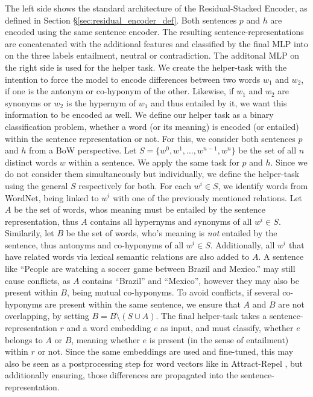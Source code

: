 The left side shows the standard architecture of the Residual-Stacked Encoder, as defined in Section §\ref{sec:residual_encoder_def}. Both sentences $p$ and $h$ are encoded using the same sentence encoder. The resulting sentence-representations are concatenated with the additional features and classified by the final \ac{MLP} into on the three labels entailment, neutral or contradiction. The additonal \ac{MLP} on the right side is used for the helper task. We create the helper-task with the intention to force the model to encode differences between two words $w_1$ and $w_2$, if one is the antonym or co-hyponym of the other.  Likewise, if $w_1$ and $w_2$ are synonyms or $w_2$ is the hypernym of $w_1$ and thus entailed by it, we want this information to be encoded as well. We define our helper task as a binary classification problem, whether a word (or its meaning) is encoded (or entailed) within the sentence representation or not. For this, we consider both sentences $p$ and $h$ from a \ac{BoW} perspective. Let $S=\{w^0, w^1 , \ldots, w^{n-1}, w^n\}$ be the set of all $n$ distinct words $w$ within a sentence. We apply the same task for $p$ and $h$. Since we do not consider them simultaneously but individually, we define the helper-task using the general $S$ respectively for both. For each $w^i \in S$, we identify words from WordNet, being linked to $w^i$ with one of the previously mentioned relations. Let $A$ be the set of words, whos meaning must be entailed by the sentence representation, thus $A$ contains all hypernyms and synonyms of all $w^i \in S$. Similarily, let $B$ be the set of words, who's meaning is \textit{not} entailed by the sentence, thus antonyms and co-hyponyms of all $w^i \in S$. Additionally, all $w^i$ that have related words via lexical semantic relations are also added to $A$. A sentence like ``People are watching a soccer game between Brazil and Mexico.'' may still cause conflicts, as $A$ contains ``Brazil'' and ``Mexico'', however they may also be present within $B$, being mutual co-hyponyms. To avoid conflicts, if several co-hyponyms are present within the same sentence, we ensure that $A$ and $B$ are not overlapping, by setting $B = B \setminus (S \cup A)$. The final helper-task takes a sentence-representation $r$ and a word embedding $e$ as input, and must classify, whether $e$ belongs to $A$ or $B$, meaning whether $e$ is present (in the sense of entailment) within $r$ or not. Since the same embeddings are used and fine-tuned, this may also be seen as a postprocessing step for word vectors like in Attract-Repel \citep{vulic2017specialising}, but additionally ensuring, those differences are propagated into the sentence-representation. 

